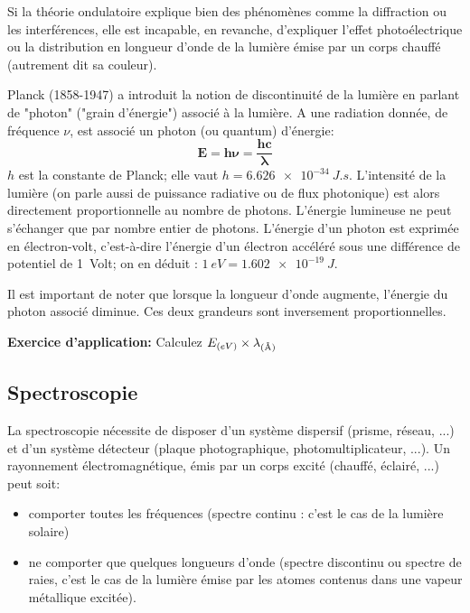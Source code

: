 \documentclass{article}
\begin{document}
Si la théorie ondulatoire explique bien des phénomènes comme la diffraction ou les interférences, elle est incapable, en revanche, d'expliquer l'effet photoélectrique ou la distribution en longueur d'onde de la lumière émise par un corps chauffé (autrement dit sa couleur). \vspace{5mm}

Planck (1858-1947) a introduit la notion de discontinuité de la lumière en parlant de "photon" ("grain d'énergie") associé à la lumière.
A une radiation donnée, de fréquence $\nu$, est associé un photon (ou quantum) d'énergie:
$$\boxed{\bm{E=h\nu=\frac{hc}{\lambda}}}$$ 
\newline
$h$ est la constante de Planck; elle vaut $h=\qty{6.626e-34}{J.s}$.\newline
L'intensité de la lumière (on parle aussi de puissance radiative ou de flux photonique) est alors directement proportionnelle au nombre de photons.
L'énergie lumineuse ne peut s'échanger que par nombre entier de photons. L'énergie d'un photon est exprimée en électron-volt, c'est-à-dire l'énergie d'un électron accéléré sous une différence de potentiel de \qty{1}{Volt}; on en déduit : $\qty{1}{eV} = \qty{1,602e-19}{J}$.

Il est important de noter que lorsque la longueur d'onde augmente, l'énergie du photon associé diminue. Ces deux grandeurs sont inversement proportionnelles.\vspace{3mm}


\textbf{Exercice d'application:} Calculez $E_{(eV)}\times \lambda_{(\text{\r{A}})}$
\vspace{5mm}

\hspace{-1cm}
\newpage

\subsection{Spectroscopie}

La spectroscopie nécessite de disposer d'un système dispersif (prisme, réseau, ...) et d'un système détecteur (plaque photographique, photomultiplicateur, ...). Un rayonnement électromagnétique, émis par un corps excité (chauffé, éclairé, ...) peut soit: 
\begin{itemize}[label=$\ast$]
    \item comporter toutes les fréquences (spectre continu : c'est le cas de la lumière solaire) 
    \item ne comporter que quelques longueurs d'onde (spectre discontinu ou spectre de raies, c'est le cas de la lumière émise par les atomes contenus dans une vapeur métallique excitée).
\end{itemize}
\end{document}
